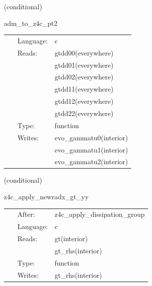 \vspace{5mm}

   (conditional) 

\hspace{5mm} adm\_to\_z4c\_pt2 

\hspace{5mm}{\it function `adm\_to\_z4c\_pt2` generated by einsteinengine. } 


\hspace{5mm}

 \begin{tabular*}{160mm}{cll} 
~ & Language:  & c \\ 
~ & Reads:  & gtdd00(everywhere) \\ 
~& ~ &gtdd01(everywhere)\\ 
~& ~ &gtdd02(everywhere)\\ 
~& ~ &gtdd11(everywhere)\\ 
~& ~ &gtdd12(everywhere)\\ 
~& ~ &gtdd22(everywhere)\\ 
~ & Type:  & function \\ 
~ & Writes:  & evo\_gammatu0(interior) \\ 
~& ~ &evo\_gammatu1(interior)\\ 
~& ~ &evo\_gammatu2(interior)\\ 
\end{tabular*} 


\vspace{5mm}

   (conditional) 

\hspace{5mm} z4c\_apply\_newradx\_gt\_yy 



\hspace{5mm}

 \begin{tabular*}{160mm}{cll} 
~ & After:  & z4c\_apply\_dissipation\_group \\ 
~ & Language:  & c \\ 
~ & Reads:  & gt(interior) \\ 
~& ~ &gt\_rhs(interior)\\ 
~ & Type:  & function \\ 
~ & Writes:  & gt\_rhs(interior) \\ 
\end{tabular*} 


